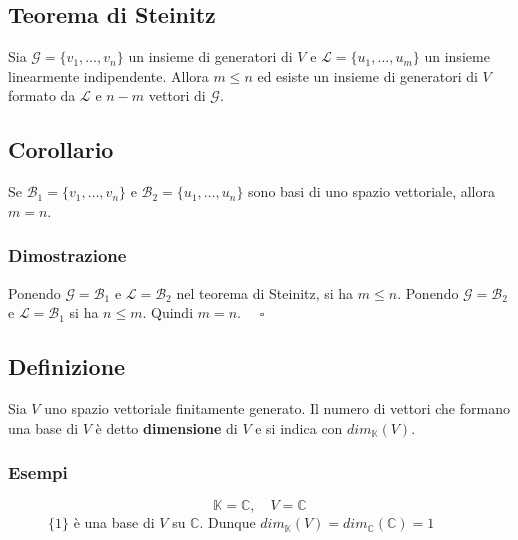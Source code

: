 \documentclass[a4paper]{article}
\theoremstyle{break}
\theoremstyle{break}
\theoremstyle{break}
\theoremstyle{break}
\begin{document}
\subsection{Teorema di Steinitz}
Sia \( \mathcal{G} = \{v_1, \ldots, v_n\}  \) un insieme di generatori di \( V \) e
\( \mathcal{L} = \{u_1, \ldots, u_m\}  \) un insieme linearmente indipendente. Allora
\( m \le n \) ed esiste un insieme di generatori di \( V \) formato da \( \mathcal{L} \) 
e \( n-m \) vettori di \( \mathcal{G} \).

\subsection{Corollario}
Se \( \mathcal{B}_1 =\{v_1, \ldots, v_n\}  \) e \( \mathcal{B}_2 = \{u_1, \ldots, u_n\}  \)
sono basi di uno spazio vettoriale, allora \( m = n \).

\subsubsection{Dimostrazione}
Ponendo \( \mathcal{G} = \mathcal{B}_1 \) e \( \mathcal{L} = \mathcal{B}_2 \) nel teorema
di Steinitz, si ha \( m \le n \). 
Ponendo \( \mathcal{G} = \mathcal{B}_2 \) e \( \mathcal{L} = \mathcal{B}_1 \) si ha
\( n \le m \). Quindi \( m = n \). \( \quad \square \)

\subsection{Definizione}
\label{6.11}
Sia \( V \) uno spazio vettoriale finitamente generato. Il numero di vettori che formano
una base di \( V \) è detto \textbf{dimensione} di \( V \) e si indica con
\( dim_\mathbb{K}(V) \). 

\subsubsection{Esempi}
\begin{figure}[H]
  \begin{example}
    \[
    \mathbb{K} = \mathbb{C}, \quad V = \mathbb{C}
    \] 
    \( \{1\} \) è una base di \( V \) su \( \mathbb{C} \). Dunque 
    \( dim_\mathbb{K}(V) = dim_{\mathbb{C}}(\mathbb{C}) = 1 \) 
  \end{example}
\end{figure}
\end{document}
